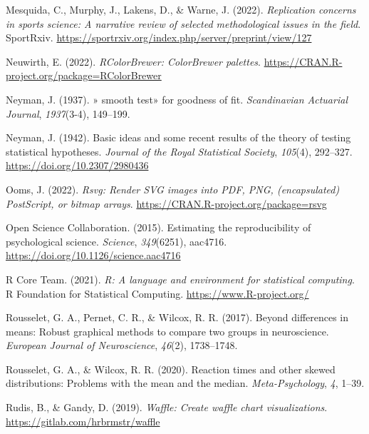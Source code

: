 \documentclass[
  doc, donotrepeattitle,floatsintext]{apa7}
\newlength{\cslhangindent}
\newlength{\cslentryspacingunit} %
\newenvironment{CSLReferences}[2] %
 {%
  \setlength{\parindent}{0pt}
  \ifodd #1
  \let\oldpar\par
  \def\par{\hangindent=\cslhangindent\oldpar}
  \fi
  \setlength{\parskip}{#2\cslentryspacingunit}
 }%
 {}
\begin{document}
\begin{CSLReferences}{1}{0}
\leavevmode{}%
Mesquida, C., Murphy, J., Lakens, D., \& Warne, J. (2022). \emph{Replication concerns in sports science: A narrative review of selected methodological issues in the field}. SportRxiv. \url{https://sportrxiv.org/index.php/server/preprint/view/127}

\leavevmode{}%
Neuwirth, E. (2022). \emph{RColorBrewer: ColorBrewer palettes}. \url{https://CRAN.R-project.org/package=RColorBrewer}

\leavevmode{}%
Neyman, J. (1937). » smooth test» for goodness of fit. \emph{Scandinavian Actuarial Journal}, \emph{1937}(3-4), 149--199.

\leavevmode{}%
Neyman, J. (1942). Basic ideas and some recent results of the theory of testing statistical hypotheses. \emph{Journal of the Royal Statistical Society}, \emph{105}(4), 292--327. \url{https://doi.org/10.2307/2980436}

\leavevmode{}%
Ooms, J. (2022). \emph{Rsvg: Render SVG images into PDF, PNG, (encapsulated) PostScript, or bitmap arrays}. \url{https://CRAN.R-project.org/package=rsvg}

\leavevmode{}%
Open Science Collaboration. (2015). Estimating the reproducibility of psychological science. \emph{Science}, \emph{349}(6251), aac4716. \url{https://doi.org/10.1126/science.aac4716}

\leavevmode{}%
R Core Team. (2021). \emph{R: A language and environment for statistical computing}. R Foundation for Statistical Computing. \url{https://www.R-project.org/}

\leavevmode{}%
Rousselet, G. A., Pernet, C. R., \& Wilcox, R. R. (2017). Beyond differences in means: Robust graphical methods to compare two groups in neuroscience. \emph{European Journal of Neuroscience}, \emph{46}(2), 1738--1748.

\leavevmode{}%
Rousselet, G. A., \& Wilcox, R. R. (2020). Reaction times and other skewed distributions: Problems with the mean and the median. \emph{Meta-Psychology}, \emph{4}, 1--39.

\leavevmode{}%
Rudis, B., \& Gandy, D. (2019). \emph{Waffle: Create waffle chart visualizations}. \url{https://gitlab.com/hrbrmstr/waffle}


\end{CSLReferences}
\end{document}
